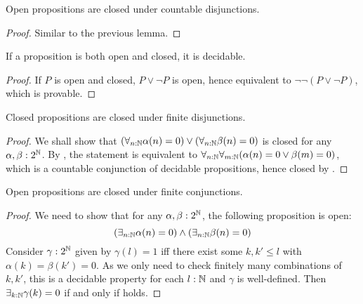 \begin{lemma}\label{OpenCountableDisjunction}
  Open propositions are closed under countable disjunctions. 
\end{lemma}
\begin{proof}
  Similar to the previous lemma. 
\end{proof}

\begin{corollary}\label{ClopenDecidable}
  If a proposition is both open and closed, it is decidable. 
\end{corollary}
\begin{proof}
  If $P$ is open and closed, $P\vee \neg P$ is open, hence
  equivalent to $\neg \neg (P \vee \neg P)$, which is provable. 
\end{proof}

\begin{lemma}\label{ClosedFiniteDisjunction} 
  Closed propositions are closed under finite disjunctions. 
\end{lemma}
\begin{proof}
  We shall show that 
  $(\forall_{n:\mathbb{N}} \alpha(n) = 0 )\vee (\forall_{n:\mathbb{N}} \beta(n) = 0 )$ is closed for any $\alpha,\beta:2^{\mathbb{N}}$.
  By , the statement is equivalent to 
  $ \forall_{n:\mathbb{N}}  \forall_{m:\mathbb{N}}  (\alpha(n) = 0 \vee \beta(m) = 0)$, 
  which is a countable conjunction of decidable propositions, 
  hence closed by .
\end{proof}
\begin{lemma}\label{OpenFiniteConjunction}
  Open propositions are closed under finite conjunctions. 
\end{lemma}
\begin{proof}
  We need to show that for any $\alpha,\beta:2^{\mathbb{N}}$, the following proposition is open:
  \begin{equation}\label{eqnConjunctionOpen}
    (\exists_{n:\mathbb{N}} \alpha(n) = 0 )\wedge(\exists_{n:\mathbb{N}} \beta(n) = 0 )
  \end{equation}
  Consider $\gamma:2^{\mathbb{N}}$ given by 
  $\gamma(l) = 1$ iff there exist some $k,k'\leq l$ with 
  $\alpha(k) = \beta(k') = 0$. 
  As we only need to check finitely many combinations 
  of $k,k'$, this is a decidable property for each $l:\mathbb{N}$ and $\gamma$ is well-defined. 
  Then $\exists_{k:\mathbb{N}}\gamma(k)=0$ if and only if  holds.
\end{proof}

